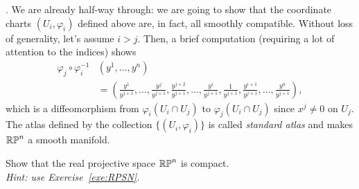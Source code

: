 \begin{example}
	.
	We are already half-way through: we are going to show that the coordinate charts $(U_i, \varphi_i)$ defined above are, in fact, all smoothly compatible.
	Without loss of generality, let's assume $i>j$.
	Then, a brief computation (requiring a lot of attention to the indices) shows
	\begin{align}
		\varphi_j\circ\varphi_i^{-1} & (y^1, \ldots, y^n)                                                                                                                                                                       \\
		                             & = \left(\frac{y^1}{y^{j+1}},\ldots,\frac{y^{j}}{y^{j+1}},\frac{y^{j+2}}{y^{j+1}},\ldots,\frac{y^i}{y^{j+1}},\frac1{y^{j+1}},\frac{y^{i+1}}{y^{j+1}}, \ldots, \frac{y^n}{y^{j+1}}\right),
	\end{align}
	which is a diffeomorphism from $\varphi_i(U_i\cap U_j)$ to $\varphi_j(U_i\cap U_j)$ since $x^j\neq 0$ on $U_j$.
	The atlas defined by the collection $\{(U_i, \varphi_i)\}$ is called \emph{standard atlas} and makes $\mathbb{RP}^n$ a smooth manifold.
\end{example}

\begin{exercise}
	Show that the real projective space $\mathbb{RP}^n$ is compact.\\
	\textit{\small Hint: use Exercise~\ref{exe:RPSN}.}
\end{exercise}

